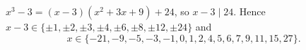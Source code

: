 $x^3-3=(x-3)(x^2+3x+9)+24$, so $x-3\mid24$. Hence $x-3\in\{\pm1,\pm2,\pm3,\pm4,\pm6,\pm8,\pm12,\pm24\}$ and
\[x\in\boxed{\{-21,-9,-5,-3,-1,0,1,2,4,5,6,7,9,11,15,27\}}.\]
